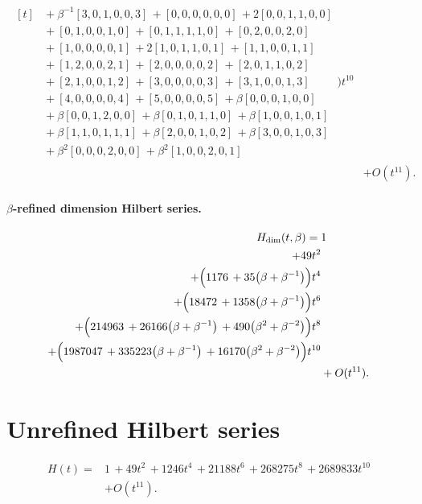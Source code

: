 \documentclass[10pt]{article}
\begin{document}
\[\begin{aligned}
\begin{aligned}[t]
  &{}+\beta^{-1}[3,0,1,0,0,3]\,+[0,0,0,0,0,0]\,+2[0,0,1,1,0,0] \\
  &{}+[0,1,0,0,1,0]\,+[0,1,1,1,1,0]\,+[0,2,0,0,2,0] \\
  &{}+[1,0,0,0,0,1]\,+2[1,0,1,1,0,1]\,+[1,1,0,0,1,1] \\
  &{}+[1,2,0,0,2,1]\,+[2,0,0,0,0,2]\,+[2,0,1,1,0,2] \\
  &{}+[2,1,0,0,1,2]\,+[3,0,0,0,0,3]\,+[3,1,0,0,1,3] \\
  &{}+[4,0,0,0,0,4]\,+[5,0,0,0,0,5]\,+\beta[0,0,0,1,0,0] \\
  &{}+\beta[0,0,1,2,0,0]\,+\beta[0,1,0,1,1,0]\,+\beta[1,0,0,1,0,1] \\
  &{}+\beta[1,1,0,1,1,1]\,+\beta[2,0,0,1,0,2]\,+\beta[3,0,0,1,0,3] \\
  &{}+\beta^{2}[0,0,0,2,0,0]\,+\beta^{2}[1,0,0,2,0,1]\end{aligned}\Bigr)t^{10} \\
  &+ O(t^{11}).
\end{aligned}
\]
\paragraph{$\beta$-refined dimension Hilbert series.}
\[
\begin{aligned}
H_{\mathrm{dim}}(t,\beta) ={}&
   1 \\
  + 49t^{2} \\
  + \Bigl(1176\,+35\bigl(\beta+\beta^{-1}\bigr)\Bigr)t^{4} \\
  + \Bigl(18472\,+1358\bigl(\beta+\beta^{-1}\bigr)\Bigr)t^{6} \\
  + \Bigl(214963\,+26166\bigl(\beta+\beta^{-1}\bigr)\,+490\bigl(\beta^{2}+\beta^{-2}\bigr)\Bigr)t^{8} \\
  + \Bigl(1987047\,+335223\bigl(\beta+\beta^{-1}\bigr)\,+16170\bigl(\beta^{2}+\beta^{-2}\bigr)\Bigr)t^{10} \\
  &+ O(t^{11}).
\end{aligned}
\]

\section{Unrefined Hilbert series}
\[
\begin{aligned}
H(t) ={}& 1\,+49t^{2}\,+1246t^{4}\,+21188t^{6}\,+268275t^{8}\,+2689833t^{10} \\
  &+ O(t^{11}).
\end{aligned}
\]
\end{document}
